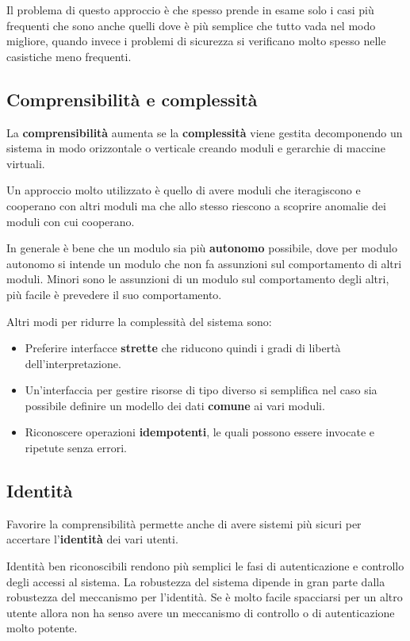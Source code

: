 Il problema di questo approccio è che spesso prende in esame solo i casi più frequenti che sono anche quelli dove è
più semplice che tutto vada nel modo migliore, quando invece i problemi di sicurezza si verificano molto spesso nelle
casistiche meno frequenti.

\subsection{Comprensibilità e complessità}
La \textbf{comprensibilità} aumenta se la \textbf{complessità} viene gestita decomponendo un sistema in modo
orizzontale o verticale creando moduli e gerarchie di maccine virtuali.

Un approccio molto utilizzato è quello di avere moduli che iteragiscono e cooperano con altri moduli ma che allo
stesso riescono a scoprire anomalie dei moduli con cui cooperano.

In generale è bene che un modulo sia più \textbf{autonomo} possibile, dove per modulo autonomo si intende un modulo
che non fa assunzioni sul comportamento di altri moduli. Minori sono le assunzioni di un modulo sul comportamento
degli altri, più facile è prevedere il suo comportamento.

Altri modi per ridurre la complessità del sistema sono:
\begin{itemize}
	\item Preferire interfacce \textbf{strette} che riducono quindi i gradi di libertà dell'interpretazione.
	\item Un'interfaccia per gestire risorse di tipo diverso si semplifica nel caso sia possibile definire un modello
	      dei dati \textbf{comune} ai vari moduli.
	\item Riconoscere operazioni \textbf{idempotenti}, le quali possono essere invocate e ripetute senza errori.
\end{itemize}

\subsection{Identità}
Favorire la comprensibilità permette anche di avere sistemi più sicuri per accertare l'\textbf{identità} dei vari
utenti.

Identità ben riconoscibili rendono più semplici le fasi di autenticazione e controllo degli accessi al sistema.
La robustezza del sistema dipende in gran parte dalla robustezza del meccanismo per l'identità. Se è molto facile
spacciarsi per un altro utente allora non ha senso avere un meccanismo di controllo o di autenticazione molto
potente.

